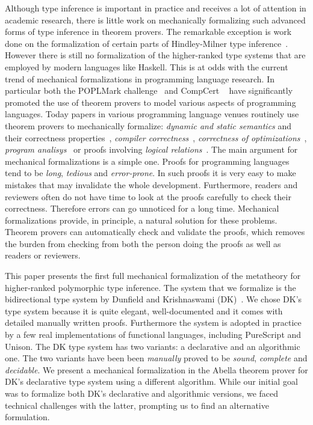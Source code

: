 Although type inference is important in practice and receives a lot of
attention in
academic research, there is little work on mechanically formalizing
such advanced forms of type inference in theorem provers.
The remarkable exception is work done on the formalization of 
certain parts of Hindley-Milner type inference~\cite{naraschewski1999type,
dubois2000proving,dubois1999certification,urban2008nominal,
garrigue2015certified}. However
there is still no formalization of the higher-ranked type systems
that are employed by modern languages like Haskell.
This is at
odds with the current trend of mechanical formalizations in
programming language research. In particular both the POPLMark
challenge~\cite{aydemir2005mechanized} and
CompCert ~\cite{leroy2012compcert} have significantly promoted
the use of theorem provers to model various aspects of programming
languages. Today papers in various programming language venues routinely
use theorem provers to mechanically formalize: \emph{dynamic and
  static semantics} and their correctness properties~\cite{aydemir2008engineering},
\emph{compiler correctness}~\cite{leroy2012compcert}, \emph{correctness of
  optimizations}~\cite{Bertot04}, \emph{program analisys}~\cite{Chang2006}
or proofs involving \emph{logical relations}~\cite{abel2018}. The
main argument for mechanical formalizations is a simple one. Proofs
for programming languages tend to be \emph{long}, \emph{tedious} and
\emph{error-prone}. In such proofs it is very easy to make mistakes
that may invalidate the whole development. Furthermore, readers and
reviewers often do not have time to look at the proofs carefully to
check their correctness. Therefore errors can go unnoticed for a
long time.  Mechanical formalizations provide, in principle, a natural
solution for these problems. Theorem provers can automatically check and
validate the proofs, which removes the burden from checking from both
the person doing the proofs as well as readers or reviewers.

This paper presents the first full mechanical formalization of the
metatheory for higher-ranked polymorphic type inference.
The system
that we formalize is the bidirectional type system by Dunfield and
Krishnaswami (DK)~\cite{dunfield2013complete}.
We chose DK's type system because it is
quite elegant, well-documented and it comes with detailed manually
written proofs. Furthermore the system is adopted in practice by a few
real implementations of functional languages, including PureScript and
Unison. The DK type system has two variants: a declarative
and an algorithmic one. The two variants have been been
\emph{manually} proved to be \emph{sound}, \emph{complete} and
\emph{decidable}.
We present a mechanical formalization in the Abella theorem prover for
DK's declarative type system using a different algorithm. While our
initial goal was to formalize both DK's declarative and algorithmic
versions, we faced technical challenges with the latter, prompting us to find
an alternative formulation.

